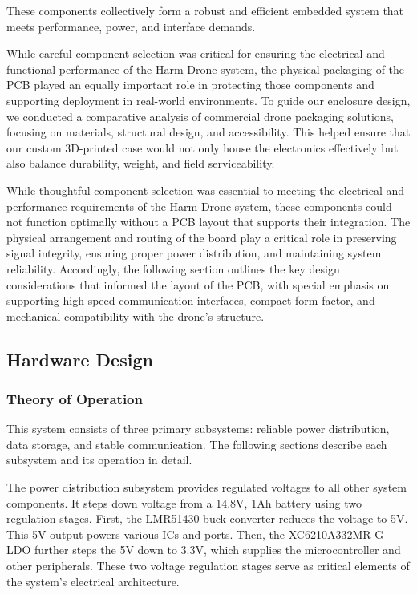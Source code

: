 \documentclass[12pt]{article}
\begin{document}
\par These components collectively form a robust and efficient embedded system that meets performance, power, and interface demands.
\par While careful component selection was critical for ensuring the electrical and functional performance of the Harm Drone system, the physical packaging of the PCB played an equally important role in protecting those components and supporting deployment in real-world environments. To guide our enclosure design, we conducted a comparative analysis of commercial drone packaging solutions, focusing on materials, structural design, and accessibility. This helped ensure that our custom 3D-printed case would not only house the electronics effectively but also balance durability, weight, and field serviceability.
\par While thoughtful component selection was essential to meeting the electrical and performance requirements of the Harm Drone system, these components could not function optimally without a PCB layout that supports their integration. The physical arrangement and routing of the board play a critical role in preserving signal integrity, ensuring proper power distribution, and maintaining system reliability. Accordingly, the following section outlines the key design considerations that informed the layout of the PCB, with special emphasis on supporting high speed communication interfaces, compact form factor, and mechanical compatibility with the drone's structure.
\subsection{Hardware Design}
\subsubsection{Theory of Operation}

This system consists of three primary subsystems: reliable power distribution, data storage, and stable communication. The following sections describe each subsystem and its operation in detail.

The power distribution subsystem provides regulated voltages to all other system components. It steps down voltage from a 14.8V, 1Ah battery using two regulation stages. First, the LMR51430 buck converter reduces the voltage to 5V. This 5V output powers various ICs and ports. Then, the XC6210A332MR-G LDO further steps the 5V down to 3.3V, which supplies the microcontroller and other peripherals. These two voltage regulation stages serve as critical elements of the system's electrical architecture.
\end{document}
